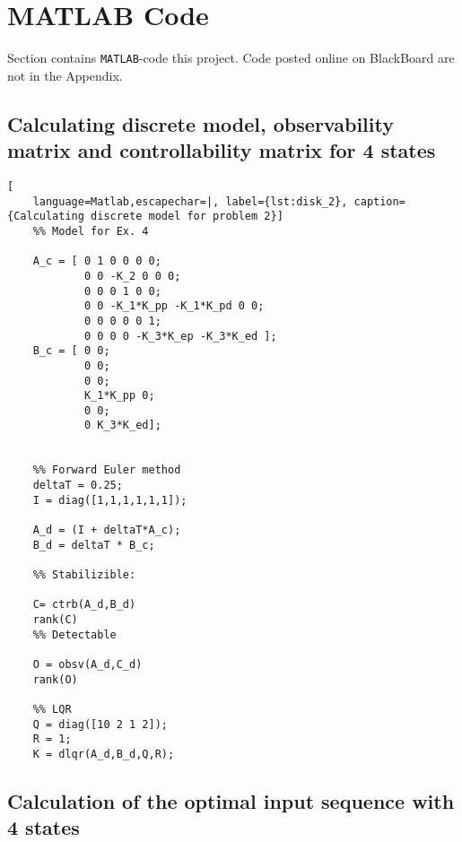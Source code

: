  \label{sec:appendix}
\appendix

\section{MATLAB Code}\label{sec:matlab}

Section contains \texttt{MATLAB}-code this project. Code posted online on BlackBoard are not in the Appendix. 

\subsection{Calculating discrete model, observability matrix and controllability matrix for 4 states} \label{sec:disk_2}
%

\begin{lstlisting}[
    language=Matlab,escapechar=|, label={lst:disk_2}, caption={Calculating discrete model for problem 2}]
    %% Model for Ex. 4

    A_c = [ 0 1 0 0 0 0; 
            0 0 -K_2 0 0 0; 
            0 0 0 1 0 0; 
            0 0 -K_1*K_pp -K_1*K_pd 0 0;
            0 0 0 0 0 1; 
            0 0 0 0 -K_3*K_ep -K_3*K_ed ];
    B_c = [ 0 0; 
            0 0; 
            0 0; 
            K_1*K_pp 0;
            0 0; 
            0 K_3*K_ed];
    
    
    %% Forward Euler method
    deltaT = 0.25;
    I = diag([1,1,1,1,1,1]);
    
    A_d = (I + deltaT*A_c);
    B_d = deltaT * B_c;
    
    %% Stabilizible:

    C= ctrb(A_d,B_d)
    rank(C)
    %% Detectable
    
    O = obsv(A_d,C_d)
    rank(O)
    
    %% LQR
    Q = diag([10 2 1 2]);
    R = 1;
    K = dlqr(A_d,B_d,Q,R);   
\end{lstlisting}

\subsection{Calculation of the optimal input sequence with 4 states }

